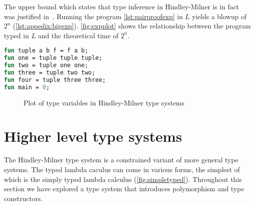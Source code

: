 The upper bound which states that type inference in Hindley-Milner is in fact  was justified in~\cite{kfoury1990ml,mairson1989deciding}.
Running the program \autoref{lst:pairproofexp} in $L$ yields a blowup of $2^n$ (\autoref{lst:appedix:bigexp}).
\autoref{fig:expplot} shows the relationship between the program typed in $L$ and the theoretical time of $2^n$.
\begin{lstlisting}[language=ML,caption={Nested tuples with different type variables},label={lst:pairproofexp},mathescape=true]
fun tuple a b f = f a b;
fun one = tuple tuple tuple;
fun two = tuple one one;
fun three = tuple two two;
fun four = tuple three three;
fun main = 0;
\end{lstlisting}
\begin{figure}[ht]
    \centering
{}
    \caption{Plot of type variables in Hindley-Milner type systems}
    \label{fig:expplot}
\end{figure}

\section{Higher level type systems}
The Hindley-Milner type system is a constrained variant of more general type systems.
The typed lambda caculus can come in various forms, the simplest of which is the simply typed lambda calculus (\autoref{fig:simpletyped}).
Throughout this section we have explored a type system that introduces polymorphism and type constructors.

